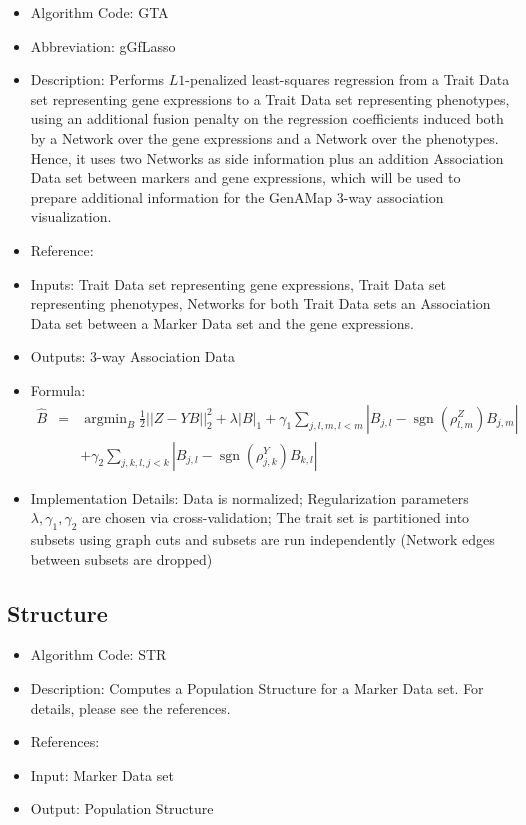 \documentclass{article}
\newcommand{\sgn}{\operatorname{sgn}}
\newcommand{\argmin}{\operatorname{argmin}}
\begin{document}
\begin{itemize}
\item Algorithm Code: GTA
\item Abbreviation: gGfLasso
\item Description: Performs $L1$-penalized least-squares regression from a Trait Data set representing gene expressions to a Trait Data set representing phenotypes, using an additional fusion penalty on the regression coefficients induced both by a Network over the gene expressions and a Network over the phenotypes. Hence, it uses two Networks as side information plus an addition Association Data set between markers and gene expressions, which will be used to prepare additional information for the GenAMap 3-way association visualization.
\item Reference: \cite{gGFLasso}
\item Inputs: Trait Data set representing gene expressions, Trait Data set representing phenotypes, Networks for both Trait Data sets an Association Data set between a Marker Data set and the gene expressions.
\item Outputs: 3-way Association Data
\item Formula:
\begin{eqnarray*}
\hat{B} &=& \argmin_{B} \frac{1}{2}||Z - YB||_2^2 + \lambda|B|_1 + \gamma_1\sum_{j,l,m, l < m}|B_{j,l} - \sgn(\rho^Z_{l,m})B_{j,m}| \\
&& + \gamma_2\sum_{j,k,l, j < k}|B_{j,l} - \sgn(\rho^Y_{j,k})B_{k,l}|
\end{eqnarray*}
\item Implementation Details: Data is normalized; Regularization parameters $\lambda, \gamma_1,\gamma_2$ are chosen via cross-validation; The trait set is partitioned into subsets using graph cuts and subsets are run independently (Network edges between subsets are dropped)
\end{itemize}

\subsection{Structure}

\begin{itemize}
\item Algorithm Code: STR
\item Description: Computes a Population Structure for a Marker Data set. For details, please see the references.
\item References: \cite{Structure} \cite{StructureLink}
\item Input: Marker Data set
\item Output: Population Structure
\end{itemize}
\end{document}
